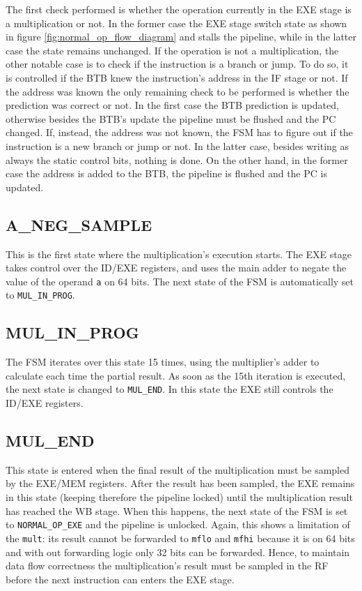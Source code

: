 The first check performed is whether the operation currently in the EXE stage is a multiplication or not. In the former case the EXE stage switch state as shown in figure \ref{fig:normal_op_flow_diagram} and stalls the pipeline,
while in the latter case the state remains unchanged. If the operation is not a multiplication, the other notable case is to check if the instruction is a branch or jump. To do so, it is controlled if the
BTB knew the instruction's address in the IF stage or not. If the address was known the only remaining check to be performed is whether the prediction was correct or not. In the first case the BTB prediction
is updated, otherwise besides the BTB's update the pipeline must be flushed and the PC changed.
If, instead, the address was not known, the FSM has to figure out if the instruction is a new branch or jump or not. In the latter case, besides writing as always the static control bits, nothing is done.
On the other hand, in the former case the address is added to the BTB, the pipeline is flushed and the PC is updated.

\subsection{A\_NEG\_SAMPLE}

This is the first state where the multiplication's execution starts. The EXE stage takes control over the ID/EXE registers, and uses the main adder to negate the value of the operand \verb|a| on 64 bits.
The next state of the FSM is automatically set to \verb|MUL_IN_PROG|.

\subsection{MUL\_IN\_PROG}

The FSM iterates over this state 15 times, using the multiplier's adder to calculate each time the partial result. As soon as the 15th iteration is executed, the next state is changed to \verb|MUL_END|.
In this state the EXE still controls the ID/EXE registers.

\subsection{MUL\_END}

This state is entered when the final result of the multiplication must be sampled by the EXE/MEM registers. After the result has been sampled, the EXE remains in this state (keeping therefore the pipeline locked)
until the multiplication result has reached the WB stage. When this happens, the next state of the FSM is set to \verb|NORMAL_OP_EXE| and the pipeline is unlocked.
Again, this shows a limitation of the \verb|mult|: its result cannot be forwarded to \verb|mflo| and \verb|mfhi| because it is on 64 bits and with out
forwarding logic only 32 bits can be forwarded. Hence, to maintain data flow correctness the multiplication's result must be sampled in the RF before the next instruction can enters the EXE stage.

